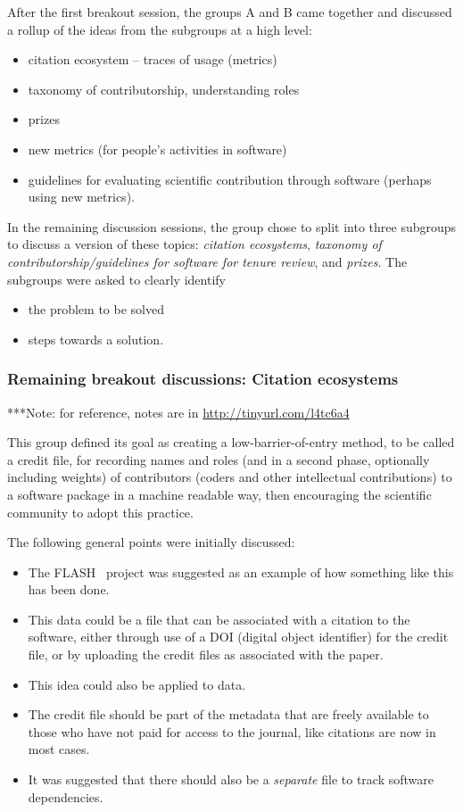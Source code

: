 \documentclass[11pt, oneside]{amsart}
\newcommand{\note}[1]{ {\textcolor{blueish}    { ***Note:      #1 }}}
\begin{document}
After the first breakout session, the groups A and B came together and discussed
a rollup of the ideas from the subgroups at a high level:
\begin{itemize}
\item citation ecosystem -- traces of usage (metrics)
\item taxonomy of contributorship, understanding roles
\item prizes
\item new metrics (for people's activities in software)
\item guidelines for evaluating scientific contribution through software (perhaps
using new metrics).
\end{itemize}

In the remaining discussion sessions, the group chose to split into three
subgroups to discuss a version of these topics: {\em citation ecosystems}, {\em
taxonomy of contributorship/guidelines for software for tenure review}, and {\em
prizes}. The subgroups were asked to clearly identify
\begin{itemize}
\item the problem to be solved
\item steps towards a solution.
\end{itemize}



\subsubsection{Remaining breakout discussions: Citation ecosystems}

\note{for reference, notes are in \url{http://tinyurl.com/l4tc6a4}}

This group defined its goal as creating a low-barrier-of-entry method, to be called a credit file,  for
recording names and roles (and in a second phase, optionally including weights)
of contributors (coders and other intellectual contributions) to a software
package in a machine readable way, then encouraging
the scientific community to adopt this practice.

The following general points were initially discussed:
\begin{itemize}
\item The FLASH~\cite{flash} project was suggested as an example of how something
like this has been done.
\item This data could be a file that can be associated with a citation to the
software, either through use of a DOI (digital object identifier) for the credit file, or by uploading the
credit files as associated with the paper.
\item This idea could also be applied to data.
\item The credit file should be part of the metadata that are freely
available to those who have not paid for access to the journal, like citations
are now in most cases.
\item It was suggested that there should also be a \emph{separate} file to track
software dependencies.%
\end{itemize}
\end{document}
